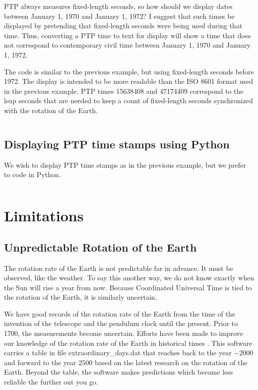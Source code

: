 \documentclass[letterpaper,twoside]{article}
\begin{document}
PTP always measures fixed-length seconds, so how should we display
dates between January 1, 1970 and January 1, 1972?  I suggest that
such times be displayed by pretending that fixed-length seconds
were being used during that time.  Thus, converting a PTP time
to text for display will show a time that does not correspond to
contemporary civil time between January 1, 1970 and January 1, 1972.

The code is similar to the previous example, but using
fixed-length seconds before 1972.  The display is intended to be
more readable than the ISO 8601 format used in the previous example.
PTP times \num{15638408} and \num{47174409} correspond to the leap
seconds that are needed to keep a count of fixed-length seconds
synchronized with the rotation of the Earth.

\inputminted[firstline=41,lastline=74]{c}{examples/example_05.c}

\subsection{Displaying PTP time stamps using Python}
\label{example:PTP_using_Python}
We wish to display PTP time stamps as in the previous example,
but we prefer to code in Python.

\inputminted[firstline=27,lastline=69]{Python}{examples/example_06.py}
  
\section{Limitations}
\subsection{Unpredictable Rotation of the Earth}
The rotation rate of the Earth is not predictable far in advance.  It must
be observed, like the weather.  To say this another way, we do not know
exactly when the Sun will rise a year from now.  Because Coordinated
Universal Time is tied to the rotation of the Earth, it is similarly
uncertain.

We have good records of the rotation rate of the Earth from the time
of the invention of the telescope and the pendulum clock until
the present.  Prior to 1700, the measurements become uncertain.
Efforts have been made to improve our knowledge of the rotation
rate of the Earth in historical times\citep{2004JHA....35..327M}%
\citep{2005JHA....36..339M}\citep{1997A&A...322..347S}%
\citep{2011ASSP...23....3S}\citep{1986PEPI...44..281M}%
\citep{Stephenson20160404}.
This software carries a table in file {\ttfamily extraordinary\_days.dat}
that reaches back to the year \num{-2000} and forward to
the year \num{2500} based on the latest research on the rotation
of the Earth.
Beyond the table, the software makes predictions which become less
reliable the further out you go.
\end{document}
